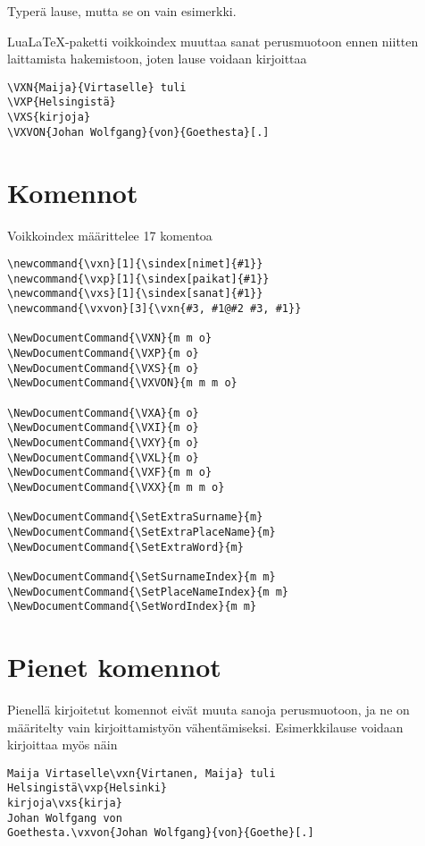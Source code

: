 \documentclass[12pt]{article}
\begin{document}
Typerä lause, mutta se on vain esimerkki.

LuaLaTeX-paketti voikkoindex muuttaa sanat perusmuotoon ennen niitten
laittamista hakemistoon, joten lause voidaan kirjoittaa

\begin{verbatim}
\VXN{Maija}{Virtaselle} tuli
\VXP{Helsingistä}
\VXS{kirjoja}
\VXVON{Johan Wolfgang}{von}{Goethesta}[.]
\end{verbatim}


\section*{Komennot}

Voikkoindex määrittelee 17 komentoa

\begin{verbatim}
\newcommand{\vxn}[1]{\sindex[nimet]{#1}}
\newcommand{\vxp}[1]{\sindex[paikat]{#1}}
\newcommand{\vxs}[1]{\sindex[sanat]{#1}}
\newcommand{\vxvon}[3]{\vxn{#3, #1@#2 #3, #1}}

\NewDocumentCommand{\VXN}{m m o}
\NewDocumentCommand{\VXP}{m o}
\NewDocumentCommand{\VXS}{m o}
\NewDocumentCommand{\VXVON}{m m m o}

\NewDocumentCommand{\VXA}{m o}
\NewDocumentCommand{\VXI}{m o}
\NewDocumentCommand{\VXY}{m o}
\NewDocumentCommand{\VXL}{m o}
\NewDocumentCommand{\VXF}{m m o}
\NewDocumentCommand{\VXX}{m m m o}

\NewDocumentCommand{\SetExtraSurname}{m}
\NewDocumentCommand{\SetExtraPlaceName}{m}
\NewDocumentCommand{\SetExtraWord}{m}

\NewDocumentCommand{\SetSurnameIndex}{m m}
\NewDocumentCommand{\SetPlaceNameIndex}{m m}
\NewDocumentCommand{\SetWordIndex}{m m}
\end{verbatim}


\section*{Pienet komennot}

Pienellä kirjoitetut komennot eivät muuta sanoja perusmuotoon, ja ne
on määritelty vain kirjoittamistyön vähentämiseksi. Esimerkkilause
voidaan kirjoittaa myös näin

\begin{verbatim}
Maija Virtaselle\vxn{Virtanen, Maija} tuli
Helsingistä\vxp{Helsinki}
kirjoja\vxs{kirja}
Johan Wolfgang von
Goethesta.\vxvon{Johan Wolfgang}{von}{Goethe}[.]
\end{verbatim}
\end{document}
